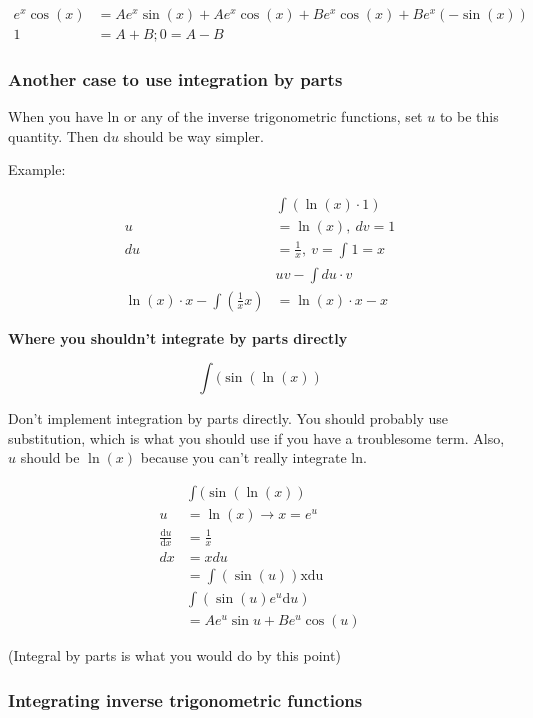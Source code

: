 \documentclass[12pt]{article}
\theoremstyle{plain}
\theoremstyle{remark}
\theoremstyle{definition}
\begin{document}
\begin{align*}
e^{x}\cos(x) &= Ae^{x}\sin(x) + Ae^{x}\cos(x) + Be^{x}\cos(x) + Be^{x}\left( - \sin(x) \right) \\
1 &= A + B;0 = A - B
\end{align*}



\subsubsection{Another case to use integration by
parts}

When you have ln or any of the inverse trigonometric functions, set
\(u\) to be this quantity. Then \(\text{d}u\) should be way simpler.

Example:

\begin{align*}
&\int\left( \ln(x) \cdot 1 \right) \\
u &= \ln(x),\ dv = 1 \\
du &= \frac{1}{x},\ v = \int_{}^{}1 = x \\
&uv - \int du \cdot v \\
\ln(x) \cdot x - \int\left( \frac{1}{x}x \right) &= \ln(x) \cdot x - x
\end{align*}


\textbf{Where you shouldn't integrate by parts directly}

\[\int(\sin\left( \ln(x) \right)\]

Don't implement integration by parts directly. You should probably use
substitution, which is what you should use if you have a troublesome
term. Also, \(u\) should be \(\ln(x)\) because you can't really
integrate ln.

\begin{align*}
&\int(\sin\left( \ln(x) \right) \\
u &= \ln(x) \rightarrow x = e^{u} \\
\frac{\text{d}u}{\text{d}x} &= \frac{1}{x} \\
dx &= xdu \\
&= \int\left( \sin(u) \right)\text{xdu} \\
&\int\left( \sin(u)e^{u}\text{d}u \right) \\
&= Ae^{u}\sin u + Be^{u}\cos(u)
\end{align*}


(Integral by parts is what you would do by this point)


\subsubsection{Integrating inverse trigonometric
functions}
\end{document}
